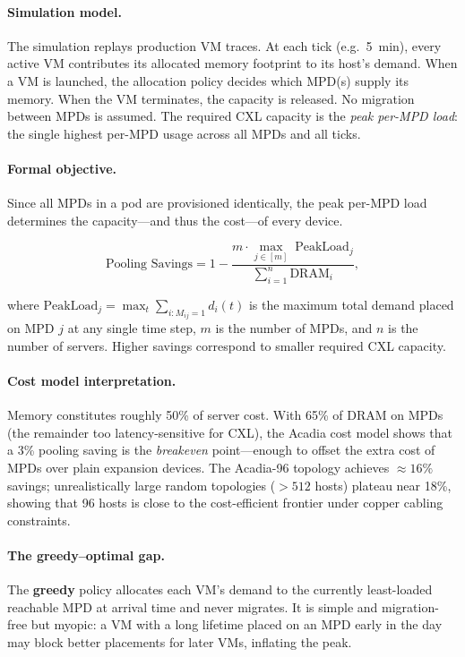 \documentclass[11pt]{article}
\begin{document}
\paragraph{Simulation model.}
The simulation replays production VM traces.  At each tick (e.g.~5~min), every
active VM contributes its allocated memory footprint to its host's demand.  When
a VM is launched, the allocation policy decides which MPD(s) supply its memory.
When the VM terminates, the capacity is released.  No migration between MPDs
is assumed.  The required CXL capacity is the \emph{peak per-MPD load}: the
single highest per-MPD usage across all MPDs and all ticks.

\paragraph{Formal objective.}
Since all MPDs in a pod are provisioned identically, the peak per-MPD load
determines the capacity---and thus the cost---of every device.

\[
    \text{Pooling Savings} = 1 -
    \frac{m \cdot \max_{j \in [m]} \; \text{PeakLoad}_j}
         {\sum_{i=1}^{n} \text{DRAM}_i},
\]

where $\text{PeakLoad}_j = \max_{t} \sum_{i : M_{ij}=1} d_i(t)$ is the maximum
total demand placed on MPD $j$ at any single time step, $m$ is the number of
MPDs, and $n$ is the number of servers.  Higher savings correspond to smaller
required CXL capacity.

\paragraph{Cost model interpretation.}
Memory constitutes roughly 50\% of server cost.  With 65\% of DRAM on MPDs
(the remainder too latency-sensitive for CXL), the Acadia cost model shows that
a 3\% pooling saving is the \emph{breakeven} point---enough to offset the extra
cost of MPDs over plain expansion devices.  The Acadia-96 topology achieves
$\approx 16\%$ savings; unrealistically large random topologies ($>512$ hosts)
plateau near 18\%, showing that 96 hosts is close to the cost-efficient frontier
under copper cabling constraints.

\paragraph{The greedy--optimal gap.}
The \textbf{greedy} policy allocates each VM's demand to the currently
least-loaded reachable MPD at arrival time and never migrates.  It is simple
and migration-free but myopic: a VM with a long lifetime placed on an MPD early
in the day may block better placements for later VMs, inflating the peak.
\end{document}
